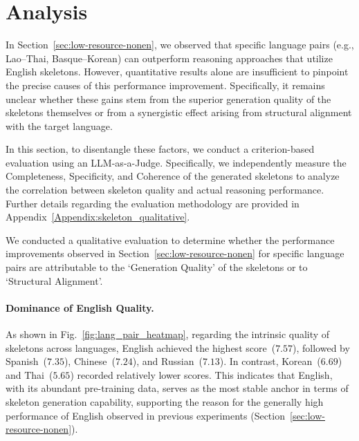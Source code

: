 \section{Analysis}
% 
In Section~\ref{sec:low-resource-nonen}, we observed that specific language pairs (e.g., Lao--Thai, Basque--Korean) can outperform reasoning approaches that utilize English skeletons. However, quantitative results alone are insufficient to pinpoint the precise causes of this performance improvement. Specifically, it remains unclear whether these gains stem from the superior generation quality of the skeletons themselves or from a synergistic effect arising from structural alignment with the target language.

In this section, to disentangle these factors, we conduct a criterion-based evaluation using an LLM-as-a-Judge. Specifically, we independently measure the Completeness, Specificity, and Coherence of the generated skeletons to analyze the correlation between skeleton quality and actual reasoning performance. Further details regarding the evaluation methodology are provided in Appendix~\ref{Appendix:skeleton_qualitative}.

We conducted a qualitative evaluation to determine whether the performance improvements observed in Section~\ref{sec:low-resource-nonen} for specific language pairs are attributable to the `Generation Quality' of the skeletons or to `Structural Alignment'.

\paragraph{Dominance of English Quality.}
As shown in Fig.~\ref{fig:lang_pair_heatmap}, regarding the intrinsic quality of skeletons across languages, English achieved the highest score~($7.57$), followed by Spanish~($7.35$), Chinese~($7.24$), and Russian~($7.13$). In contrast, Korean~($6.69$) and Thai~($5.65$) recorded relatively lower scores. This indicates that English, with its abundant pre-training data, serves as the most stable anchor in terms of skeleton generation capability, supporting the reason for the generally high performance of English observed in previous experiments (Section~\ref{sec:low-resource-nonen}).

